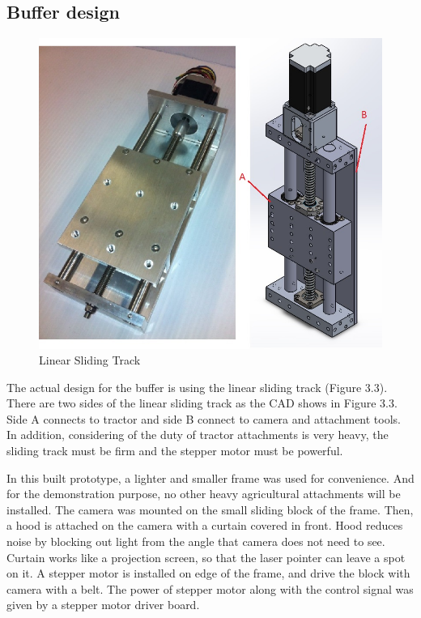 \documentclass[letterpaper,12pt,oneside]{book}
\begin{document}
		\subsection{Buffer design}
		\begin{figure}[ht!]
			\begin{center}
				\includegraphics[scale = 0.6]{1D.jpg}
				\caption{Linear Sliding Track}
			\end{center}
		\end{figure}
		The actual design for the buffer is using the linear sliding track (Figure 3.3). There are two sides of the linear sliding track as the CAD shows in Figure 3.3. Side A connects to tractor and side B connect to camera and attachment tools. In addition, considering of the duty of tractor attachments is very heavy, the sliding track must be firm and the stepper motor must be powerful.
		
		In this built prototype, a lighter and smaller frame was used for convenience. And for the demonstration purpose, no other heavy agricultural attachments will be installed. The camera was mounted on the small sliding block of the frame. Then, a hood is attached on the camera with a curtain covered in front. Hood reduces noise by blocking out light from the angle that camera does not need to see. Curtain works like a projection screen, so that the laser pointer can leave a spot on it.  A stepper motor is installed on edge of the frame, and drive the block with camera with a belt. The power of stepper motor along with the control signal was given by a stepper motor driver board. 
		
\end{document}
